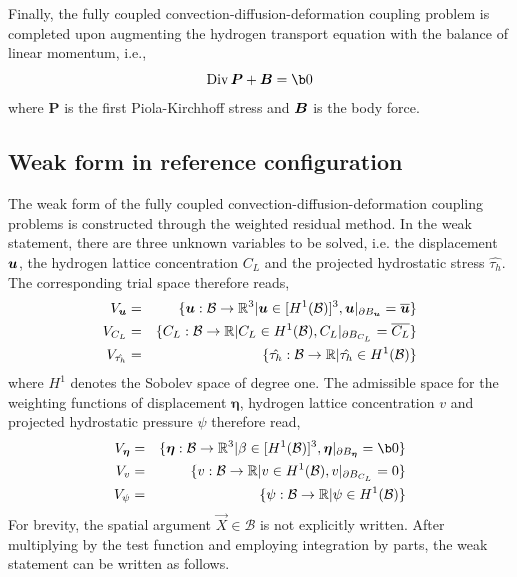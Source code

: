 \documentclass[10pt]{elsarticle}
\newcommand{\mbs}[1]{\boldsymbol{#1}}
\def\beeta{{\mbs{\eta}}}
\DeclareMathOperator{\Div}{Div}
\newcommand{\tensor}[1]{\ensuremath{\boldsymbol{#1}}}
\begin{document}
Finally, the fully coupled convection-diffusion-deformation coupling problem is completed upon augmenting the hydrogen transport equation with the balance of linear momentum, i.e.,
\begin{equation}
\label{eq:balanceLinearMomentum} \Div \tensor{P} +  \bB = \b0  
\end{equation}
where $\tensor{P}$ is the first Piola-Kirchhoff stress and $\bB$ is the body force. 
%

\subsection{Weak form in reference configuration}
The weak form of the fully coupled convection-diffusion-deformation coupling problems is constructed
through the weighted residual method. In the weak statement, there are three unknown variables to be solved, i.e. 
the displacement $\bu$, the hydrogen lattice concentration $C_{L}$  and the projected hydrostatic stress $\hat{\tau_{h}}$. 
The corresponding trial space therefore reads, 
\begin{eqnarray}
    \label{eq:trialSpace}
      V_{\bu} &=& \{ \bu : \mathcal{B} \rightarrow \mathbb{R}^{3} | \bu \in [H^{1}(\mathcal{B})]^{3} , \label{eq:uspace} \bu|_{\partial B_{\bu}} = \overline{\bu} \} \nonumber \\
       V_{C_{L}} &=& \{ C_{L} : \mathcal{B} \rightarrow \mathbb{R} | C_{L} \in H^{1}(\mathcal{B}), C_{L}|_{\partial B_{C_{L}}} = \overline{C_{L}} \} \\
      V_{\hat{\tau_{h}}} &=& \{  \hat{\tau_{h}} : \mathcal{B} \rightarrow \mathbb{R} | \hat{\tau_{h}} \in H^{1}(\mathcal{B}) \} \nonumber 
    \end{eqnarray}
    where $H^{1}$ denotes the Sobolev space of degree one.  The
    admissible space for the weighting functions of displacement $\beeta$, hydrogen lattice concentration $v$ and projected hydrostatic pressure $\psi$ therefore read,
    \begin{eqnarray}
    \label{eq:variation}
      V_{\beeta} &=& \{  \beeta : \mathcal{B} \rightarrow \mathbb{R}^{3} | \beta \in [H^{1}(\mathcal{B})]^{3} ,  \beeta|_{\partial B_{\beeta}} = \b0 \} \nonumber \\
      V_{v} &=& \{ v : \mathcal{B} \rightarrow \mathbb{R} | v \in H^{1}(\mathcal{B}), v|_{\partial B_{C_{L}}} =0 \}  \\
      V_{\psi} &=& \{ \psi : \mathcal{B} \rightarrow \mathbb{R} | \psi \in H^{1}(\mathcal{B}) \}
      \nonumber 
      \label{eq:varp}
    \end{eqnarray}
    For brevity, the spatial argument $\vec{X} \in \mathcal{B}$ is not
    explicitly written. After multiplying by the test function and employing integration by parts, the weak statement can be written as follows. 
    
\end{document}
